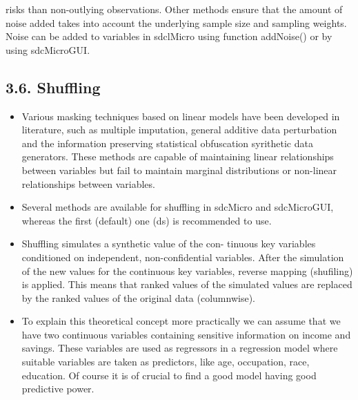 \documentclass[]{article}
\begin{document}
risks than non-outlying observations. Other methods ensure that the amount of
noise added takes into account the underlying sample size and sampling weights.
Noise can be added to variables in sdclMicro using function addNoise() or by
using sdcMicroGUI.
\newpage
\subsection*{3.6. Shuffling}
\begin{itemize}
\item 
Various masking techniques based on linear models have been developed in literature, such as multiple imputation, general additive data perturbation and the information preserving statistical obfuscation syrithetic data generators. These methods are capable of maintaining
linear relationships between variables but fail to maintain marginal distributions
or non-linear relationships between variables.

\item Several methods are available for shuffling in sdcMicro and sdcMicroGUI, whereas
the ﬁrst (default) one (ds) is recommended to use. 

\item Shuffling simulates a synthetic value of the con-
tinuous key variables conditioned on independent, non-conﬁdential variables. After
the simulation of the new values for the continuous key variables, reverse mapping
(shuﬁling) is applied. This means that ranked values of the simulated values are
replaced by the ranked values of the original data (columnwise).

\item To explain this theoretical concept more practically we can assume that we have
two continuous variables containing sensitive information on income and savings.
These variables are used as regressors in a regression model where suitable variables
are taken as predictors, like age, occupation, race, education. Of course it is of
crucial to ﬁnd a good model having good predictive power. 


\end{itemize}
\end{document}
